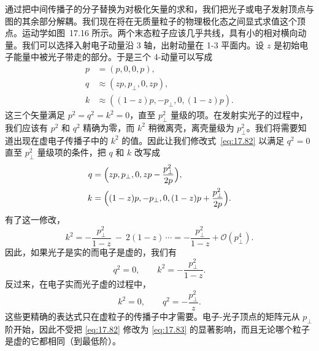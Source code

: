 通过把中间传播子的分子替换为对极化矢量的求和，我们把光子或电子发射顶点与图的其余部分解耦。我们现在将在无质量粒子的物理极化态之间显式求值这个顶点。运动学如图~17.16 所示。两个末态粒子应该几乎共线，具有小的相对横向动量。我们可以选择入射电子动量沿 3 轴，出射动量在 1-3 平面内。设 $z$ 是初始电子能量中被光子带走的部分。于是三个 4-动量可以写成
\begin{equation}
  \begin{aligned}
    p &= (p, 0, 0, p),\\
    q &\approx (zp, p_\perp, 0, zp),\\
    k &\approx ((1-z)p, -p_\perp, 0, (1-z)p) .
  \end{aligned}
  \label{eq:17.82}
\end{equation}
这三个矢量满足 $p^2 = q^2 = k^2 = 0$，直至 $p_\perp^2$ 量级的项。在发射实光子的过程中，我们应该有 $p^2$ 和 $q^2$ 精确为零，而 $k^2$ 稍微离壳，离壳量级为 $p_\perp^2$。我们将需要知道出现在虚电子传播子中的 $k^2$ 的值。因此让我们修改式~\eqref{eq:17.82} 以满足 $q^2 = 0$ 直至 $p_\perp^2$ 量级项的条件，把 $q$ 和 $k$ 改写成
\begin{equation}
  \begin{aligned}
    q &= \Bigl( zp, p_\perp, 0, zp - \frac{p_\perp^2}{2p} \Bigr),\\
    k &= \Bigl( (1-z)p, -p_\perp, 0, (1-z)p + \frac{p_\perp^2}{2p}
      \Bigr) .
  \end{aligned}
  \label{eq:17.83}
\end{equation}
有了这一修改，
\begin{equation}
  k^2 = -\frac{p_\perp^2}{1-z}\ -\ 2(1-z)\,\cdots = -\frac{p_\perp^2}{1-z}
    + \mathcal{O}(p_\perp^4) .
  \label{eq:17.84}
\end{equation}
因此，如果光子是实的而电子是虚的，我们有
\begin{equation}
  q^2 = 0,\qquad k^2 = -\frac{p_\perp^2}{1-z} .
\end{equation}
反过来，在电子实而光子虚的过程中，
\begin{equation}
  k^2 = 0,\qquad q^2 = -\frac{p_\perp^2}{z} .
  \label{eq:17.85}
\end{equation}
这些更精确的表达式只在虚粒子的传播子中才需要。电子-光子顶点的矩阵元从 $p_\perp$ 阶开始，因此不受把 \eqref{eq:17.82} 修改为 \eqref{eq:17.83} 的显著影响，而且无论哪个粒子是虚的它都相同（到最低阶）。

